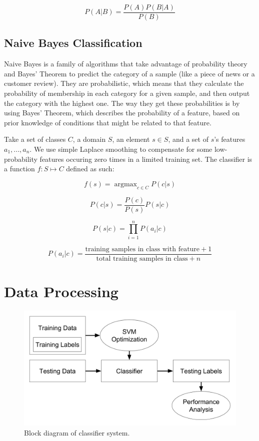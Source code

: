 \documentclass[format=acmlarge]{acmart}
\DeclareMathOperator*{\argmax}{argmax}
\begin{document}
$$P(A|B) = \frac{P(A) P(B|A)}{P(B)}$$

\subsection{Naive Bayes Classification}
Naive Bayes is a family of algorithms that take advantage of probability theory and Bayes' Theorem to predict the category of a sample (like a piece of news or a customer review). They are probabilistic, which means that they calculate the probability of membership in each category for a given sample, and then output the category with the highest one. The way they get these probabilities is by using Bayes' Theorem, which describes the probability of a feature, based on prior knowledge of conditions that might be related to that feature.

Take a set of classes $C$, a domain $S$, an element $s \in S$, and a set of $s$'s features $a_1, ..., a_n$.  We use simple Laplace smoothing to compensate for some low-probability features occuring zero times in a limited training set.  The classifier is a function $f: S \mapsto C$ defined as such:

$$f(s) = \argmax_{c \in C} P(c|s)$$

$$P(c|s) = \frac{P(c)}{P(s)} P(s|c)$$

$$P(s|c) = \prod_{i = 1}^n P(a_i|c)$$

$$P(a_i|c) = \frac{\textrm{training samples in class with feature} + 1}{\textrm{total training samples in class} + n}$$

\section{Data Processing}
\begin{figure}
  \includegraphics{block-diagram}
  \caption{Block diagram of classifier system.}
  \label{fig:one}
\end{figure}
\end{document}
